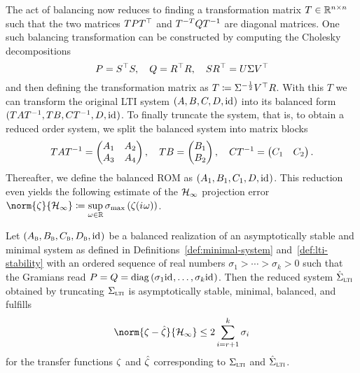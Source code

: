The act of balancing now reduces to finding a transformation matrix $T \in \mathbb{R}^{n \times n}$ such that the two matrices $T P T^{\top}$ and $T\inv[T] Q T\inv$ are diagonal matrices.
One such balancing transformation can be constructed by computing the Cholesky decompositions
\begin{equation}\label{eq:balancing}
    P = S^{\top} S,\quad Q = R^{\top} R,\quad S R^{\top} = U \Sigma V^{\top}
\end{equation}
and then defining the transformation matrix as $T \coloneqq \Sigma\inv[\frac{1}{2}] V\trans R$.
With this $T$ we can transform the original \ac{LTI} system $(A, B, C, D, \text{id}_{})$ into its balanced form $(T A T\inv, T B, C T\inv, D, \id)$.
To finally truncate the system, that is, to obtain a reduced order system, we split the balanced system into matrix blocks
\begin{equation*}
    T A T\inv = \begin{pmatrix}
        A_1 & A_2 \\
        A_3 & A_4
    \end{pmatrix},\quad T B = \begin{pmatrix}
        B_1 \\
        B_2
    \end{pmatrix},\quad C T\inv = \begin{pmatrix}
        C_1 & C_2
    \end{pmatrix}.
\end{equation*}
Thereafter, we define the balanced \ac{ROM} as $(A_1, B_1, C_1, D, \text{id}_{})$.
This reduction even yields the following estimate of the $\mathcal{H}_\infty$ projection error $\norm{\tfunc}{\mcl{H}_\infty} \coloneqq \sup\limits_{\omega \in \bb{R}} \sigma_{\max} \left( \tfunc(\iu \omega) \right)$.

\begin{theorem}\label{thm:h-inf-error}
    Let $(A_{\textnormal{\scshape b}}, B_{\textnormal{\scshape b}}, C_{\textnormal{\scshape b}}, D_{\textnormal{\scshape b}}, \text{id}_{})$ be a balanced realization of an asymptotically stable and minimal system as defined in Definitions~\ref{def:minimal-system} and~\ref{def:lti-stability} with an ordered sequence of real numbers $\sigma_1 > \cdots > \sigma_k > 0$ such that the Gramians read $P = Q = \mathop{}\!\mathrm{diag}\left(\sigma_1 \text{id}_{}, \dots, \sigma_k \text{id}_{}\right)$.
    Then the reduced system $\hat{\Sigma}_{\textnormal{\scshape lti}}$ obtained by truncating $\Sigma_{\textnormal{\scshape lti}}$ is asymptotically stable, minimal, balanced, and fulfills
    \begin{equation*}
        \norm{\tfunc - \hat{\tfunc}}{\mcl{H}_\infty} \leq 2 \sum\limits_{i = r + 1}^k \sigma_i
    \end{equation*}
    for the transfer functions $\zeta$ and $\hat{\zeta}$ corresponding to $\Sigma_{\textnormal{\scshape lti}}$ and $\hat{\Sigma}_{\textnormal{\scshape lti}}$.
\end{theorem}

